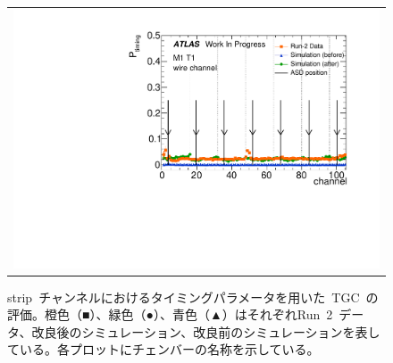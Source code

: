 \begin{figure}[htbp]
\begin{tabular}{l}
			\begin{minipage}{0.22\hsize}
				\includegraphics[width=\textwidth,page=43]{img/pdf5/master_timingplot_comp.pdf}
			\end{minipage}
			\vspace{0.5cm}\\ 

		\end{tabular}
		\caption[strip~チャンネルにおけるタイミングパラメータを用いた~TGC~の評価。]{strip~チャンネルにおけるタイミングパラメータを用いた~TGC~の評価。橙色（■）、緑色（●）、青色（▲）はそれぞれRun~2~データ、改良後のシミュレーション、改良前のシミュレーションを表している。各プロットにチェンバーの名称を示している。}
		\label{fig:timingPlotCompStrip}
	\end{figure}
	